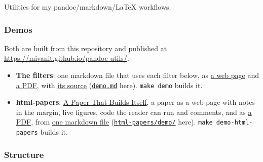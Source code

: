 \documentclass[
]{article}
\providecommand{\tightlist}{%
  \setlength{\itemsep}{0pt}\setlength{\parskip}{0pt}}
\begin{document}
Utilities for my pandoc/markdown/LaTeX workflows.

\subsubsection{Demos}\label{demos}

Both are built from this repository and published at
\url{https://mivanit.github.io/pandoc-utils/}.

\begin{itemize}
\tightlist
\item
  \textbf{The filters}: one markdown file that uses each filter below,
  as \href{https://mivanit.github.io/pandoc-utils/demo.html}{a web page}
  and \href{https://mivanit.github.io/pandoc-utils/demo.pdf}{a PDF},
  with \href{https://mivanit.github.io/pandoc-utils/demo.md}{its source}
  (\href{demo.md}{\texttt{demo.md}} here). \texttt{make\ demo} builds
  it.
\item
  \textbf{html-papers}:
  \href{https://mivanit.github.io/pandoc-utils/html-papers/}{A Paper
  That Builds Itself}, a paper as a web page with notes in the margin,
  live figures, code the reader can run and comments, and as
  \href{https://mivanit.github.io/pandoc-utils/html-papers/paper.pdf}{a
  PDF}, from
  \href{https://mivanit.github.io/pandoc-utils/html-papers/paper.md}{one
  markdown file}
  (\href{https://github.com/mivanit/pandoc-utils/tree/main/html-papers/demo}{\texttt{html-papers/demo/}}
  here). \texttt{make\ demo-html-papers} builds it.
\end{itemize}

\subsubsection{Structure}\label{structure}
\end{document}
